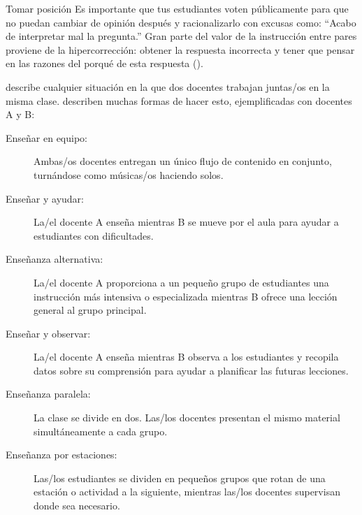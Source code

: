\newpage
\begin{aside}{Tomar posición}
  Es importante que tus estudiantes voten públicamente
  para que no puedan cambiar de opinión después y racionalizarlo
  con excusas como: ``Acabo de interpretar mal la pregunta.''
  Gran parte del valor de la instrucción entre pares proviene de la hipercorrección:
  obtener la respuesta incorrecta
  y tener que pensar en las razones del porqué de esta respuesta
  ().
\end{aside}


 describe cualquier situación
en la que dos docentes trabajan juntas/os en la misma clase.
\cite{Frie2016} describen muchas formas de hacer esto, ejemplificadas con docentes A y B:

\begin{description}

\item[Enseñar en equipo:]
  Ambas/os docentes entregan un único flujo de contenido en conjunto,
  turnándose como músicas/os haciendo solos.

\item[Enseñar y ayudar:]
  La/el docente A enseña mientras B se mueve por el aula
  para ayudar a estudiantes con dificultades.

\item[Enseñanza alternativa:]
  La/el docente A proporciona a un pequeño grupo de estudiantes
  una instrucción más intensiva o especializada
  mientras B ofrece una lección general al grupo principal.
 
\item[Enseñar y observar:]
  La/el docente A enseña mientras B observa a los estudiantes
  y recopila datos sobre su comprensión para ayudar a planificar las futuras lecciones.

\item[Enseñanza paralela:]
  La clase se divide en dos. 
  Las/los docentes presentan el mismo material simultáneamente a cada grupo.

\item[Enseñanza por estaciones:]
  Las/los estudiantes se dividen en pequeños grupos
  que rotan de una estación o actividad a la siguiente,
  mientras las/los docentes supervisan donde sea necesario.

\end{description}

